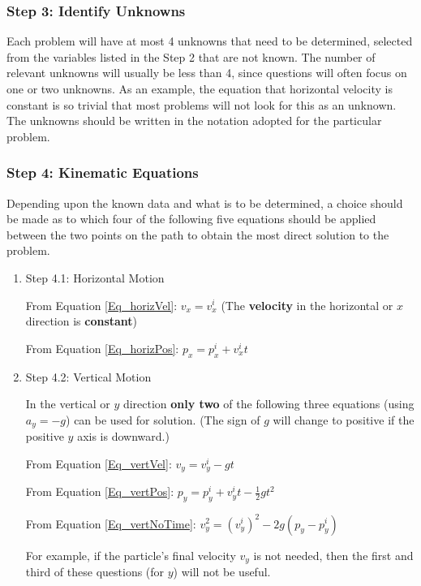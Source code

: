 \documentclass[12pt]{article}
\begin{document}
\subsubsection{Step 3: Identify Unknowns}
\label{sec:org4de893b}

Each problem will have at most 4 unknowns that need to be determined,
selected from the variables listed in the Step 2 that are not known.
The number of relevant unknowns will usually be less than 4, since
questions will often focus on one or two unknowns.  As an example, the
equation that horizontal velocity is constant is so trivial that most
problems will not look for this as an unknown.  The unknowns should be
written in the notation adopted for the particular problem.

\subsubsection{Step 4: Kinematic Equations}
\label{sec:org5e4a6ca}

Depending upon the known data and what is to be determined, a choice
should be made as to which four of the following five equations should
be applied between the two points on the path to obtain the most
direct solution to the problem.

\begin{enumerate}
\item Step 4.1: Horizontal Motion
\label{sec:orgfa3c7a5}

From Equation \ref{Eq_horizVel}: \(v_x = v_x^i\) (The \textbf{velocity} in the
horizontal or \(x\) direction is \textbf{constant})

From Equation \ref{Eq_horizPos}: \(p_x = p_x^i + v_x^i t\)

\item Step 4.2: Vertical Motion
\label{sec:org41d6b39}

In the vertical or \(y\) direction \textbf{only two} of the following three
equations (using \(a_y = -g\)) can be used for solution.  (The sign of
\(g\) will change to positive if the positive \(y\) axis is downward.)

From Equation \ref{Eq_vertVel}: \(v_y = v_y^i - g t\)

From Equation \ref{Eq_vertPos}: \(p_y = p_y^i + v_y^i t - \frac{1}{2} g t^2\)

From Equation \ref{Eq_vertNoTime}: \(v_y^2 = (v_y^i)^2 - 2 g ( p_y - p_y^i)\)

For example, if the particle's final velocity \(v_y\) is not needed,
then the first and third of these questions (for \(y\)) will not be
useful.
\end{enumerate}
\end{document}
